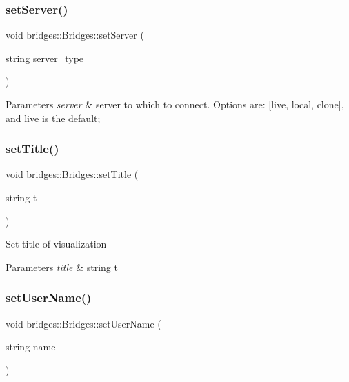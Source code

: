 \subsubsection{\texorpdfstring{set\+Server()}{setServer()}}
{\footnotesize\ttfamily void bridges\+::\+Bridges\+::set\+Server (\begin{DoxyParamCaption}\item[{string}]{server\+\_\+type }\end{DoxyParamCaption})}


\begin{DoxyParams}{Parameters}
{\em server} & server to which to connect. Options are\+: \mbox{[}\textquotesingle{}live\textquotesingle{}, \textquotesingle{}local\textquotesingle{}, \textquotesingle{}clone\textquotesingle{}\mbox{]}, and \textquotesingle{}live\textquotesingle{} is the default; \\
\hline
\end{DoxyParams}
\mbox{\label{namespacebridges_1_1_bridges_af36e132d582dabf5ae5ee8b8f26976db}} 
\subsubsection{\texorpdfstring{set\+Title()}{setTitle()}}
{\footnotesize\ttfamily void bridges\+::\+Bridges\+::set\+Title (\begin{DoxyParamCaption}\item[{string}]{t }\end{DoxyParamCaption})}

Set title of visualization


\begin{DoxyParams}{Parameters}
{\em title} & string t \\
\hline
\end{DoxyParams}
\mbox{\label{namespacebridges_1_1_bridges_a383c5c1d3c85541f466e0cb60dde1c29}} 
\subsubsection{\texorpdfstring{set\+User\+Name()}{setUserName()}}
{\footnotesize\ttfamily void bridges\+::\+Bridges\+::set\+User\+Name (\begin{DoxyParamCaption}\item[{string}]{name }\end{DoxyParamCaption})}


